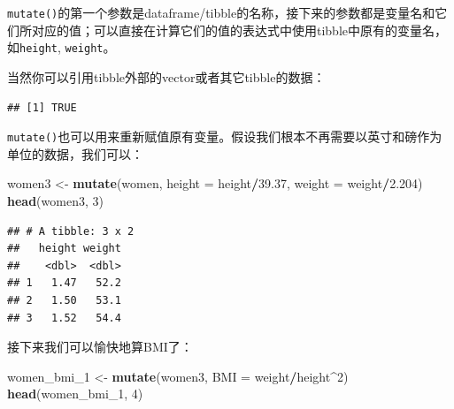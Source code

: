 \documentclass[]{book}
\newenvironment{Shaded}{\begin{snugshade}}{\end{snugshade}}
\newcommand{\CommentTok}[1]{\textcolor[rgb]{0.56,0.35,0.01}{\textit{#1}}}
\newcommand{\DataTypeTok}[1]{\textcolor[rgb]{0.13,0.29,0.53}{#1}}
\newcommand{\DecValTok}[1]{\textcolor[rgb]{0.00,0.00,0.81}{#1}}
\newcommand{\FloatTok}[1]{\textcolor[rgb]{0.00,0.00,0.81}{#1}}
\newcommand{\KeywordTok}[1]{\textcolor[rgb]{0.13,0.29,0.53}{\textbf{#1}}}
\newcommand{\NormalTok}[1]{#1}
\newcommand{\OperatorTok}[1]{\textcolor[rgb]{0.81,0.36,0.00}{\textbf{#1}}}
\newcommand{\StringTok}[1]{\textcolor[rgb]{0.31,0.60,0.02}{#1}}
\begin{document}
\texttt{mutate()}的第一个参数是dataframe/tibble的名称，接下来的参数都是变量名和它们所对应的值；可以直接在计算它们的值的表达式中使用tibble中原有的变量名，如\texttt{height}, \texttt{weight}。

当然你可以引用tibble外部的vector或者其它tibble的数据：

\begin{Shaded}
\end{Shaded}

\begin{verbatim}
## [1] TRUE
\end{verbatim}

\texttt{mutate()}也可以用来重新赋值原有变量。假设我们根本不再需要以英寸和磅作为单位的数据，我们可以：

\begin{Shaded}
\begin{Highlighting}[]
\NormalTok{women3 <-}\StringTok{ }\KeywordTok{mutate}\NormalTok{(women, }\DataTypeTok{height =}\NormalTok{ height}\OperatorTok{/}\FloatTok{39.37}\NormalTok{, }\DataTypeTok{weight =}\NormalTok{ weight}\OperatorTok{/}\FloatTok{2.204}\NormalTok{)}
\KeywordTok{head}\NormalTok{(women3, }\DecValTok{3}\NormalTok{)}
\end{Highlighting}
\end{Shaded}

\begin{verbatim}
## # A tibble: 3 x 2
##   height weight
##    <dbl>  <dbl>
## 1   1.47   52.2
## 2   1.50   53.1
## 3   1.52   54.4
\end{verbatim}

接下来我们可以愉快地算BMI了：

\begin{Shaded}
\begin{Highlighting}[]
\NormalTok{women_bmi_}\DecValTok{1}\NormalTok{ <-}\StringTok{ }\KeywordTok{mutate}\NormalTok{(women3, }\DataTypeTok{BMI =}\NormalTok{ weight}\OperatorTok{/}\NormalTok{height}\OperatorTok{^}\DecValTok{2}\NormalTok{)}
\KeywordTok{head}\NormalTok{(women_bmi_}\DecValTok{1}\NormalTok{, }\DecValTok{4}\NormalTok{)}
\end{Highlighting}
\end{Shaded}
\end{document}
